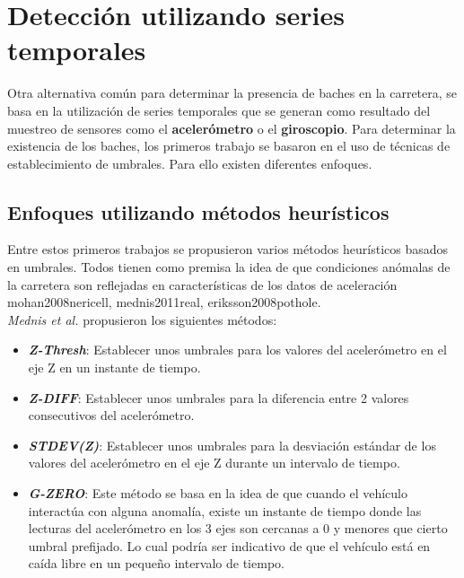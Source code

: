 
\section{Detección utilizando series temporales}
	Otra alternativa común para determinar la presencia de baches en la carretera, se basa en la utilización de series temporales que se generan como
	resultado del muestreo de sensores como el \textbf{acelerómetro} o el \textbf{giroscopio}. Para determinar la existencia de los baches, los primeros
	trabajo se basaron en el uso de técnicas de establecimiento de umbrales. Para ello existen diferentes enfoques.

	\subsection{Enfoques utilizando métodos heurísticos}
		Entre estos primeros trabajos se propusieron varios métodos heurísticos basados en umbrales. Todos tienen como premisa
		la idea de que condiciones anómalas de la carretera son reflejadas en características de los datos de aceleración\brackcite
		{mohan2008nericell, mednis2011real, eriksson2008pothole}.\\

		\emph{Mednis et al.} propusieron los siguientes métodos:\\

		\begin{itemize}
			\item  \emph{\textbf {Z-Thresh}}: Establecer unos umbrales para los valores del acelerómetro en el eje Z en un instante de tiempo.\\
			\item \emph{\textbf {Z-DIFF}}: Establecer unos umbrales para la diferencia entre 2 valores consecutivos del acelerómetro.\\
			\item \emph{\textbf {STDEV(Z)}}: Establecer unos umbrales para la desviación estándar de los valores del acelerómetro en
				el eje Z durante un intervalo de tiempo.\\ 
			\item \emph{\textbf {G-ZERO}}: Este método se basa en la idea de que cuando el vehículo interactúa con alguna anomalía, existe un
				instante de tiempo donde las lecturas del acelerómetro en los 3 ejes son cercanas a 0 y menores que cierto umbral prefijado. Lo 
				cual podría ser indicativo de que el vehículo está en caída libre en un pequeño intervalo de tiempo.
		\end{itemize}

